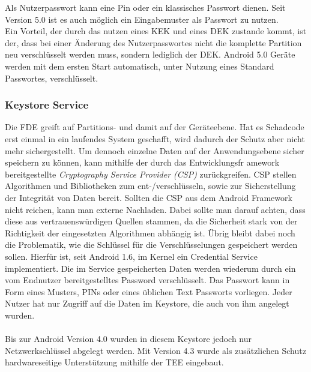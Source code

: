 	Als Nutzerpasswort kann eine Pin oder ein klassisches Passwort dienen. Seit Version 5.0 ist es auch möglich ein Eingabemuster als Passwort zu nutzen. \\
	Ein Vorteil, der durch das nutzen eines KEK und eines DEK zustande kommt, ist der, dass bei einer Änderung des Nutzerpasswortes nicht die komplette Partition neu verschlüsselt werden muss, sondern lediglich der DEK. Android 5.0 Geräte werden mit dem ersten Start automatisch, unter Nutzung eines Standard Passwortes, verschlüsselt. 
	
	\subsubsection{Keystore Service}
	Die FDE greift auf Partitions- und damit auf der Geräteebene. Hat es Schadcode erst einmal in ein laufendes System geschafft, wird dadurch der Schutz aber nicht mehr sichergestellt. Um dennoch einzelne Daten auf der Anwendungsebene sicher speichern zu können, kann mithilfe der durch das Entwicklungsfr amework bereitgestellte \textit{Cryptography Service Provider (CSP)} zurückgreifen. CSP stellen Algorithmen und Bibliotheken zum ent-/verschlüsseln, sowie zur Sicherstellung der Integrität von Daten bereit. Sollten die CSP aus dem Android Framework nicht reichen, kann man externe Nachladen. Dabei sollte man darauf achten, dass diese aus vertrauenswürdigen Quellen stammen, da die Sicherheit stark von der Richtigkeit der eingesetzten Algorithmen abhängig ist. Übrig bleibt dabei noch die Problematik, wie die Schlüssel für die Verschlüsselungen gespeichert werden sollen. Hierfür ist, seit Android 1.6, im Kernel ein Credential Service implementiert. Die im Service gespeicherten Daten werden wiederum durch ein vom Endnutzer bereitgestelltes Password verschlüsselt. Das Passwort kann in Form eines Musters, PINs oder eines üblichen Text Passworts vorliegen. Jeder Nutzer hat nur Zugriff auf die Daten im Keystore, die auch von ihm angelegt wurden.\\\\	
	Bis zur Android Version 4.0 wurden in diesem Keystore jedoch nur Netzwerkschlüssel abgelegt werden. Mit Version 4.3 wurde als zusätzlichen Schutz hardwareseitige Unterstützung mithilfe der TEE eingebaut.
